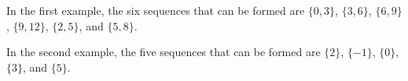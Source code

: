 In the first example, the six sequences that can be formed are $\{0,3\}$, $\{3,6\}$, $\{6,9\}$, $\{9,12\}$, $\{2,5\}$, and $\{5,8\}$.

In the second example, the five sequences that can be formed are $\{2\}$, $\{-1\}$, $\{0\}$, $\{3\}$, and $\{5\}$.
